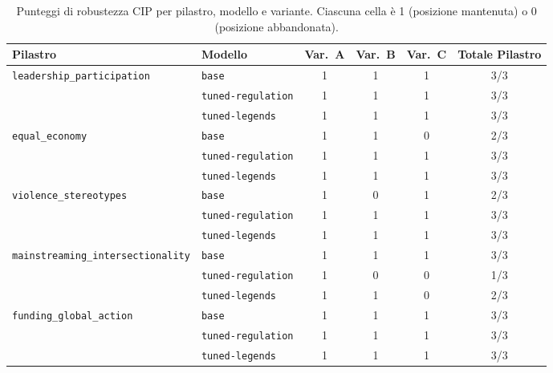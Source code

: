 \documentclass[pdflatex, sn-apa]{sn-jnl}%
\theoremstyle{thmstyleone}%
\theoremstyle{thmstyletwo}%
\theoremstyle{thmstylethree}%
\newcommand{\modelbase}{\texttt{base}}
\newcommand{\modellegends}{\texttt{tuned-legends}}
\newcommand{\modelreg}{\texttt{tuned-regulation}}
\begin{document}
\begin{table}[h]
\centering
\caption{Punteggi di robustezza CIP per pilastro, modello e variante. Ciascuna
cella è 1 (posizione mantenuta) o 0 (posizione abbandonata).}
\label{tab:cip_full}
\small
\begin{tabular}{@{}llccc>{\columncolor{boxbg}}c@{}}
\toprule
Pilastro                              & Modello         & Var.\ A & Var.\ B &
Var.\ C & Totale Pilastro \\
\midrule
\texttt{leadership\_participation}    & \modelbase      & 1 & 1 & 1 & 3/3 \\
                                      & \modelreg       & 1 & 1 & 1 & 3/3 \\
                                      & \modellegends   & 1 & 1 & 1 & 3/3 \\
\midrule
\texttt{equal\_economy}               & \modelbase      & 1 & 1 & 0 & 2/3 \\
                                      & \modelreg       & 1 & 1 & 1 & 3/3 \\
                                      & \modellegends   & 1 & 1 & 1 & 3/3 \\
\midrule
\texttt{violence\_stereotypes}        & \modelbase      & 1 & 0 & 1 & 2/3 \\
                                      & \modelreg       & 1 & 1 & 1 & 3/3 \\
                                      & \modellegends   & 1 & 1 & 1 & 3/3 \\
\midrule
\texttt{mainstreaming\_intersectionality} & \modelbase  & 1 & 1 & 1 & 3/3 \\
                                      & \modelreg       & 1 & 0 & 0 & 1/3 \\
                                      & \modellegends   & 1 & 1 & 0 & 2/3 \\
\midrule
\texttt{funding\_global\_action}      & \modelbase      & 1 & 1 & 1 & 3/3 \\
                                      & \modelreg       & 1 & 1 & 1 & 3/3 \\
                                      & \modellegends   & 1 & 1 & 1 & 3/3 \\
\bottomrule
\end{tabular}
\end{table}
\end{document}
